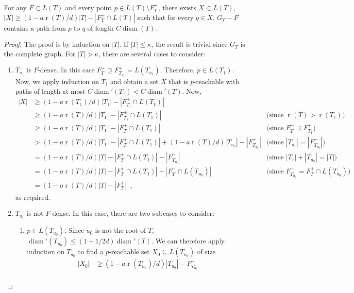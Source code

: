 \documentclass{patmorin}
\DeclareMathOperator{\rank}{r}
\DeclareMathOperator{\diam}{diam}
\begin{document}
\begin{clm}
  For any $F\subset L(T)$ and every point $p\in L(T)\setminus F^+_T$,
	there exists $X\subset L(T)$, $|X|\ge (1-a\rank(T)/d)|T|-|F^+_T\cap L(T)|$
  such that for every $q\in X$, $G_T-F$
  contains a path from $p$ to $q$ of length $C\diam(T)$.
\end{clm}

\begin{proof}
  The proof is by induction on $|T|$.  If $|T|\le\kappa$, the result is trivial since $G_T$ is the complete graph.
  For $|T|>\kappa$, there are several cases to consider:
  \begin{enumerate}
	  \item $T_{u_1}$ is $F$-dense. In this case $F^+_T\supseteq
	  F^+_{T_{u_1}}= L(T_{u_1})$. Therefore, $p\in L(T_1)$.
          Now, we apply induction on $T_1$
       and obtain a set $X$ that is $p$-reachable with paths of length at
		  most $C\diam'(T_1)< C\diam'(T)$.  Now, 
	\begin{align*}
		|X| & \ge (1-a\rank(T_1)/d)|T_1|-|F^+_{T_1} \cap L(T_1)| \\
		& \ge (1-a\rank(T)/d)|T_1|-|F^+_{T_1} \cap L(T_1)| 
	 	& \text{(since $\rank(T)>\rank(T_1)$)} \\
		& \ge (1-a\rank(T)/d)|T_1|-|F^+_{T} \cap L(T_1)| 
		& \text{(since $F^+_T\supseteq F^+_{T_1}$)} \\
		& > (1-a\rank(T)/d)|T_1|-|F^+_{T} \cap L(T_1)| 
		  + (1-a\rank(T)/d)|T_{u_0}|-|F^+_{T_{u_0}}|
		& \text{(since $|T_{u_0}|=|F^+_{T_{u_0}}|$)} \\
		& = (1-a\rank(T)/d)|T|-|F^+_{T}\cap L(T_1)| - |F^+_{T_{u_0}}|
		& \text{(since $|T_1|+|T_{u_0}|=|T|$)} \\
		& = (1-a\rank(T)/d)|T|-|F^+_{T}\cap L(T_1)| - |F^+_T\cap L(T_{u_0})|
		& \text{(since $F^+_{T_{u_0}}=F^+_T\cap L(T_{u_0})$)} \\
		& = (1-a\rank(T)/d)|T|-|F^+_{T}| \enspace , 
	\end{align*}
	as required.
    \item $T_{u_1}$ is not $F$-dense. In this case, there are two subcases
    to consider:
    \begin{enumerate}
	    \item $p\in L(T_{u_0})$. 
		    Since $u_0$ is not the root of $T$, $\diam'(T_{u_0}) \le (1-1/2d)\diam'(T)$.  We can therefore apply induction on $T_{u_0}$ to find a $p$-reachable set $X_0\subseteq L(T_{u_0})$ of size 
\begin{align*}
	|X_0| & \ge (1-a\rank(T_{u_0})/d)|T_{u_0}|-F^+_{T_{u_0}} \\

\end{align*}
\end{enumerate}
\end{enumerate}
\end{proof}
\end{document}
